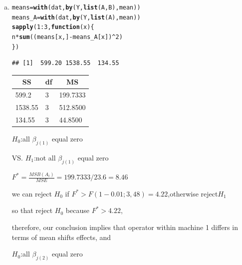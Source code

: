 \documentclass{article}\usepackage[]{graphicx}\usepackage[]{color}
\makeatletter
\newcommand{\hlnum}[1]{\textcolor[rgb]{0.686,0.059,0.569}{#1}}%
\newcommand{\hlopt}[1]{\textcolor[rgb]{0,0,0}{#1}}%
\newcommand{\hlstd}[1]{\textcolor[rgb]{0.345,0.345,0.345}{#1}}%
\newcommand{\hlkwa}[1]{\textcolor[rgb]{0.161,0.373,0.58}{\textbf{#1}}}%
\newcommand{\hlkwb}[1]{\textcolor[rgb]{0.69,0.353,0.396}{#1}}%
\newcommand{\hlkwc}[1]{\textcolor[rgb]{0.333,0.667,0.333}{#1}}%
\newcommand{\hlkwd}[1]{\textcolor[rgb]{0.737,0.353,0.396}{\textbf{#1}}}%
\newenvironment{kframe}{%
 \def\at@end@of@kframe{}%
 \ifinner\ifhmode%
  \def\at@end@of@kframe{\end{minipage}}%
  \begin{minipage}{\columnwidth}%
 \fi\fi%
 \def\FrameCommand##1{\hskip\@totalleftmargin \hskip-\fboxsep
 \colorbox{shadecolor}{##1}\hskip-\fboxsep
     \hskip-\linewidth \hskip-\@totalleftmargin \hskip\columnwidth}%
 \MakeFramed {\advance\hsize-\width
   \@totalleftmargin\z@ \linewidth\hsize
   \@setminipage}}%
 {\par\unskip\endMakeFramed%
 \at@end@of@kframe}
\newenvironment{knitrout}{}{} %
\makeatother
\begin{document}
\begin{enumerate}[(a)]
\item

\begin{knitrout}
\color{fgcolor}\begin{kframe}
\begin{alltt}
  \hlstd{means} \hlkwb{=} \hlkwd{with}\hlstd{(dat,} \hlkwd{by}\hlstd{(Y,} \hlkwd{list}\hlstd{(A, B), mean))}
  \hlstd{means_A} \hlkwb{=} \hlkwd{with}\hlstd{(dat,} \hlkwd{by}\hlstd{(Y,} \hlkwd{list}\hlstd{(A), mean))}
  \hlkwd{sapply}\hlstd{(}\hlnum{1}\hlopt{:}\hlnum{3}\hlstd{,} \hlkwa{function}\hlstd{(}\hlkwc{x}\hlstd{)\{}
        \hlstd{n}\hlopt{*}\hlkwd{sum}\hlstd{((means[x,]}\hlopt{-}\hlstd{means_A[x])}\hlopt{^}\hlnum{2}\hlstd{)}
  \hlstd{\})}
\end{alltt}
\begin{verbatim}
## [1]  599.20 1538.55  134.55
\end{verbatim}
\end{kframe}
\end{knitrout}

\begin{table}[h]
\begin{tabular}{lll}
\hline
\multicolumn{1}{|c|}{SS} & \multicolumn{1}{c|}{df} & \multicolumn{1}{c|}{MS} \\ \hline
599.2                    & 3                       & 199.7333                \\
1538.55                  & 3                       & 512.8500                \\
134.55                   & 3                       & 44.8500                
\end{tabular}
\end{table}

\begin{center}
$H_0$:all $\beta_{j(1)}$ equal zero

VS. $H_1$:not all $\beta_{j(1)}$ equal zero

$F^*=\frac{MSB(A_i)}{MSE} = 199.7333/23.6  = 8.46$

we can reject $H_0$ if $F^* > F(1-0.01;3,48)=4.22$,otherwise reject$H_1$

so that reject $H_0$ because $F^*>4.22$,

therefore, our conclusion implies that operator within machine 1 differs in terms of mean shifts effects, and 
\end{center}

\begin{center}
$H_0$:all $\beta_{j(2)}$ equal zero


\end{center}
\end{enumerate}
\end{document}
